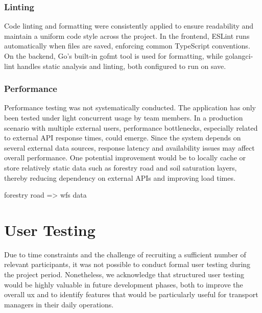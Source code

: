 \subsubsection{Linting}

Code linting and formatting were consistently applied to ensure readability and maintain a uniform code style across the project. In the frontend, ESLint runs automatically when files are saved, enforcing common TypeScript conventions. On the backend, Go's built-in gofmt tool is used for formatting, while golangci-lint handles static analysis and linting, both configured to run on save.

\subsubsection{Performance}

Performance testing was not systematically conducted. The application has only been tested under light concurrent usage by team members. In a production scenario with multiple external users, performance bottlenecks, especially related to external API response times, could emerge. Since the system depends on several external data sources, response latency and availability issues may affect overall performance. One potential improvement would be to locally cache or store relatively static data such as forestry road and soil saturation layers, thereby reducing dependency on external APIs and improving load times.

forestry road => \acrshort{wfs} data 

\begin{comment}
\subsubsection*{Logging}

In the backend server a logging system was implemented \textcolor{orange}{skal dette nevnes her ?}

\end{comment}

\section{User Testing}\label{sec:quality_assurance_user_feedback:user_testing}

Due to time constraints and the challenge of recruiting a sufficient number of relevant participants, it was not possible to conduct formal user testing during the project period. Nonetheless, we acknowledge that structured user testing would be highly valuable in future development phases, both to improve the overall \acrfull{ux} and to identify features that would be particularly useful for transport managers in their daily operations.

